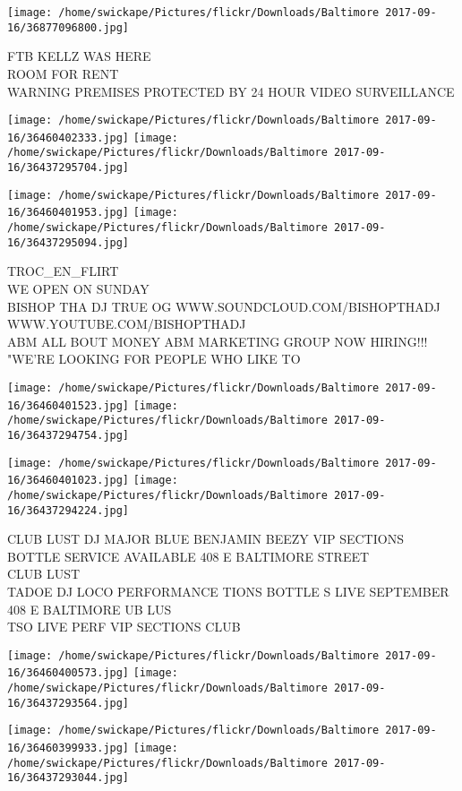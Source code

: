 \documentclass[10pt,letterpaper]{article}
\begin{document}
\vspace{0.25in}
\texttt{[image: /home/swickape/Pictures/flickr/Downloads/Baltimore 2017-09-16/36877096800.jpg]}

FTB KELLZ WAS HERE\\
ROOM FOR RENT\\
WARNING PREMISES PROTECTED BY 24 HOUR VIDEO SURVEILLANCE
\pagebreak

\texttt{[image: /home/swickape/Pictures/flickr/Downloads/Baltimore 2017-09-16/36460402333.jpg]}
\texttt{[image: /home/swickape/Pictures/flickr/Downloads/Baltimore 2017-09-16/36437295704.jpg]}

\texttt{[image: /home/swickape/Pictures/flickr/Downloads/Baltimore 2017-09-16/36460401953.jpg]}
\texttt{[image: /home/swickape/Pictures/flickr/Downloads/Baltimore 2017-09-16/36437295094.jpg]}

TROC\_EN\_FLIRT\\
WE OPEN ON SUNDAY\\
BISHOP THA DJ TRUE OG WWW.SOUNDCLOUD.COM/BISHOPTHADJ WWW.YOUTUBE.COM/BISHOPTHADJ\\
ABM ALL BOUT MONEY ABM MARKETING GROUP NOW HIRING!!! "WE'RE LOOKING FOR PEOPLE WHO LIKE TO
\pagebreak

\texttt{[image: /home/swickape/Pictures/flickr/Downloads/Baltimore 2017-09-16/36460401523.jpg]}
\texttt{[image: /home/swickape/Pictures/flickr/Downloads/Baltimore 2017-09-16/36437294754.jpg]}

\texttt{[image: /home/swickape/Pictures/flickr/Downloads/Baltimore 2017-09-16/36460401023.jpg]}
\texttt{[image: /home/swickape/Pictures/flickr/Downloads/Baltimore 2017-09-16/36437294224.jpg]}

CLUB LUST DJ MAJOR BLUE BENJAMIN BEEZY VIP SECTIONS BOTTLE SERVICE AVAILABLE 408 E BALTIMORE STREET\\
CLUB LUST\\
TADOE DJ LOCO PERFORMANCE TIONS BOTTLE S LIVE SEPTEMBER 408 E BALTIMORE UB LUS\\
TSO LIVE PERF VIP SECTIONS CLUB
\pagebreak

\texttt{[image: /home/swickape/Pictures/flickr/Downloads/Baltimore 2017-09-16/36460400573.jpg]}
\texttt{[image: /home/swickape/Pictures/flickr/Downloads/Baltimore 2017-09-16/36437293564.jpg]}

\texttt{[image: /home/swickape/Pictures/flickr/Downloads/Baltimore 2017-09-16/36460399933.jpg]}
\texttt{[image: /home/swickape/Pictures/flickr/Downloads/Baltimore 2017-09-16/36437293044.jpg]}
\end{document}
